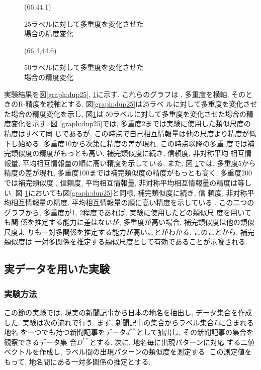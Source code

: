 \begin{figure}[htbp]
\newlength{\minitwocolumn}
\setlength{\minitwocolumn}{0.5\textwidth}
\addtolength{\minitwocolumn}{-0.5\columnsep}
\begin{minipage}[h]{\minitwocolumn}
\centering
\atari(66,44.1)
\caption{25ラベルに対して多重度を変化させた \\ 場合の精度変化} \label{graph:dup25}
\end{minipage}
\begin{minipage}[h]{\minitwocolumn}
\centering
\atari(66.4,44.6)
\caption{50ラベルに対して多重度を変化させた \\ 場合の精度変化} \label{graph:dup50}
\end{minipage}
\end{figure}
実験結果を図\ref{graph:dup25}, \ref{graph:dup50}に示す. これらのグラフは
, 多重度を横軸, そのときのR-精度を縦軸とする. 図\ref{graph:dup25}は25ラベ
ルに対して多重度を変化させた場合の精度変化を示し, 図\ref{graph:dup50}は
50ラベルに対して多重度を変化させた場合の精度変化を示す. 図
\ref{graph:dup25}では, 多重度2までは実験に使用した類似尺度の精度はすべて同
じであるが, この時点で自己相互情報量は他の尺度より精度が低下し始める. 
多重度10から次第に精度の差が現れ, この時点以降の多重
度では補完類似度の精度がもっとも高い. 補完類似度に続き, 信頼度, 非対称平均
相互情報量, 平均相互情報量の順に高い精度を示している. また, 図
\ref{graph:dup50}では, 多重度5から精度の差が現れ, 
多重度100までは補完類似度の精度がもっとも高く, 多重度200では補完類似度
, 信頼度, 平均相互情報量, 非対称平均相互情報量の精度は等しい. 図
\ref{graph:dup50}においても図\ref{graph:dup25}と同様, 補完類似度に続き, 信
頼度, 非対称平均相互情報量の精度, 平均相互情報量の順に高い精度を示している
. この二つのグラフから, 多重度が1, 2程度であれば, 実験に使用したどの類似尺
度を用いても関
係を推定する能力に差はないが, 多重度が高い場合, 補完類似度は他の類似尺度よ
りも一対多関係を推定する能力が高いことがわかる. このことから, 補完類似度は
一対多関係を推定する類似尺度として有効であることが示唆される. 

\subsection{実データを用いた実験} \label{real}
\subsubsection{実験方法} 
この節の実験では, 現実の新聞記事から日本の地名を抽出し, 
データ集合を作成した. 
実験は次の流れで行う. 
まず, 新聞記事の集合からラベル集合$L$に含まれる地名
を一つでも持つ新聞記事をデータ$d^{**}$として抽出し, 
その新聞記事の集合を観察できるデータ集
合$D^{**}$とする. 次に, 地名毎に出現パターンに対応
する二値ベクトルを作成し, 
ラベル間の出現パターンの類似度を測定する. 
この測定値をもって, 地名間にある一対多関係の推定とする. 


